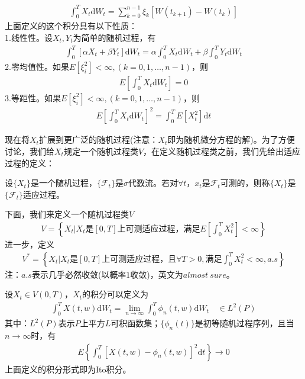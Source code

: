             \begin{align*}
                \int_0^T X_t \mathrm{d}W_t = \sum_{k = 0}^{n - 1} \xi_k [W(t_{k+1}) - W(t_k)]
            \end{align*}
            上面定义的这个积分具有以下性质：\\
            1.线性性。设$X_t,Y_t$为简单的随机过程，有
            \begin{align*}
                \int_0^T [\alpha X_t + \beta Y_t] \mathrm{d}W_t = \alpha \int_0^TX_t\mathrm{d}W_t + \beta \int_0^TY_t\mathrm{d}W_t
            \end{align*}
            2.零均值性。如果$E[\xi_i^2]<\infty,(k = 0,1,\dots,n-1)$，则
            \begin{align*}
                E\left[ \int_0^T X_t \mathrm{d}W_t\right] = 0
            \end{align*}
            3.等距性。如果$E[\xi_i^2]<\infty,(k = 0,1,\dots,n-1)$，则
            \begin{align*}
            E\left[ \int_0^T X_t \mathrm{d}W_t\right]^2 =\int_0^T E\left[ X_t^2 \right]\mathrm{d}t
            \end{align*}
            \par
            现在将$X_t$扩展到更广泛的随机过程(注意：$X_t$即为随机微分方程的解)。为了方便讨论，我们给$X_t$规定一个随机过程类$V$，在定义随机过程类之前，我们先给出适应过程的定义：
            \begin{definition}[适应过程]
            设$\{X_t\}$是一个随机过程，$\{\mathcal{F}_t\}$是$\sigma$代数流。若对$\forall t$，$x_t$是$\mathcal{F}_t$可测的，则称$\{X_t\}$是$\{\mathcal{F}_t\}$适应过程。
            \end{definition}
            \par
            下面，我们来定义一个随机过程类$V$
            \begin{align*}
                V = \left\{X_t\biggl|X_t\text{是}[0,T]\text{上可测适应过程，满足}E\left[ \int_0^T X_t^2 \right] < \infty\right\}
            \end{align*}
            进一步，定义
            \begin{align*}
                V^* = \left\{X_t\biggl|X_t\text{是}[0,T]\text{上可测适应过程，且}\forall T>0,\text{满足} \int_0^T X_t^2 < \infty ,a.s\right\}
            \end{align*}
            注：$a.s$表示几乎必然收敛(以概率$1$收敛)，英文为$almost\ sure$。
            \begin{definition}[Ito积分]
            设$X_t\in V(0,T)$，$X_t$的积分可以定义为
            \begin{align*}
                \int_0^T X(t,w) \mathrm{d}W_t = \lim_{n \rightarrow \infty}\int_0^T \phi_n(t,w)\mathrm{d}W_t \quad \in L^2(P)
            \end{align*}
            其中：$L^2(P)$表示$P$上平方$L$可积函数集；$\{\phi_n(t)\}$是初等随机过程序列，且当$n\rightarrow \infty$时，有
            \begin{align*}
                E\left\{ \int_0^T [X(t,w) - \phi_n(t,w)]^2 \mathrm{d}t\right\} \rightarrow 0
            \end{align*}
            上面定义的积分形式即为Ito积分。
            \end{definition}
